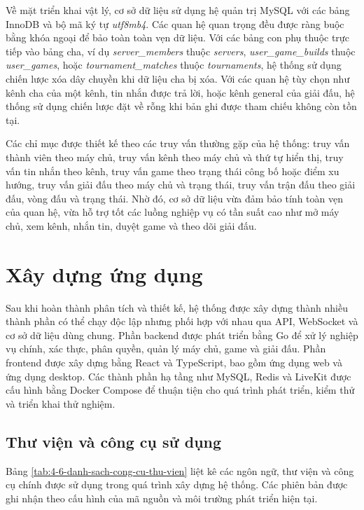 \documentclass[../DoAn.tex]{subfiles}
\begin{document}
Về mặt triển khai vật lý, cơ sở dữ liệu sử dụng hệ quản trị MySQL với các bảng InnoDB và bộ mã ký tự \textit{utf8mb4}. Các quan hệ quan trọng đều được ràng buộc bằng khóa ngoại để bảo toàn toàn vẹn dữ liệu. Với các bảng con phụ thuộc trực tiếp vào bảng cha, ví dụ \textit{server\_members} thuộc \textit{servers}, \textit{user\_game\_builds} thuộc \textit{user\_games}, hoặc \textit{tournament\_matches} thuộc \textit{tournaments}, hệ thống sử dụng chiến lược xóa dây chuyền khi dữ liệu cha bị xóa. Với các quan hệ tùy chọn như kênh cha của một kênh, tin nhắn được trả lời, hoặc kênh general của giải đấu, hệ thống sử dụng chiến lược đặt về rỗng khi bản ghi được tham chiếu không còn tồn tại.

Các chỉ mục được thiết kế theo các truy vấn thường gặp của hệ thống: truy vấn thành viên theo máy chủ, truy vấn kênh theo máy chủ và thứ tự hiển thị, truy vấn tin nhắn theo kênh, truy vấn game theo trạng thái công bố hoặc điểm xu hướng, truy vấn giải đấu theo máy chủ và trạng thái, truy vấn trận đấu theo giải đấu, vòng đấu và trạng thái. Nhờ đó, cơ sở dữ liệu vừa đảm bảo tính toàn vẹn của quan hệ, vừa hỗ trợ tốt các luồng nghiệp vụ có tần suất cao như mở máy chủ, xem kênh, nhắn tin, duyệt game và theo dõi giải đấu.

\section{Xây dựng ứng dụng}
\label{section:4.3}

Sau khi hoàn thành phân tích và thiết kế, hệ thống được xây dựng thành nhiều thành phần có thể chạy độc lập nhưng phối hợp với nhau qua API, WebSocket và cơ sở dữ liệu dùng chung. Phần backend được phát triển bằng Go để xử lý nghiệp vụ chính, xác thực, phân quyền, quản lý máy chủ, game và giải đấu. Phần frontend được xây dựng bằng React và TypeScript, bao gồm ứng dụng web và ứng dụng desktop. Các thành phần hạ tầng như MySQL, Redis và LiveKit được cấu hình bằng Docker Compose để thuận tiện cho quá trình phát triển, kiểm thử và triển khai thử nghiệm.

\subsection{Thư viện và công cụ sử dụng}
\label{subsection:4.3.1}

Bảng \ref{tab:4-6-danh-sach-cong-cu-thu-vien} liệt kê các ngôn ngữ, thư viện và công cụ chính được sử dụng trong quá trình xây dựng hệ thống. Các phiên bản được ghi nhận theo cấu hình của mã nguồn và môi trường phát triển hiện tại.
\end{document}
